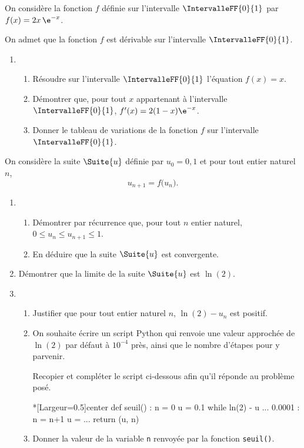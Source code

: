 On considère la fonction $f$ définie sur l'intervalle $\IntervalleFF{0}{1}$ par $f(x)=2x\,\e^{-x}$.

On admet que la fonction $f$ est dérivable sur l'intervalle $\IntervalleFF{0}{1}$.

\begin{enumerate}
	\item 
	\begin{enumerate}
		\item Résoudre sur l'intervalle $\IntervalleFF{0}{1}$ l'équation $f(x)=x$.
		\item Démontrer que, pour tout $x$ appartenant à l'intervalle $\IntervalleFF{0}{1}$, $f'(x)=2(1-x)\e^{-x}$.
		\item Donner le tableau de variations de la fonction $f$ sur l'intervalle $\IntervalleFF{0}{1}$.
	\end{enumerate}
\end{enumerate}


On considère la suite $\Suite{u}$ définie par $u_0=0,1$ et pour tout entier naturel $n$, \[ u_{n+1}=f\big(u_n\big).\]

\begin{enumerate}[resume]
	\item 
	\begin{enumerate}
		\item Démontrer par récurrence que, pour tout $n$ entier naturel, $0 \leqslant u_n \leqslant u_{n+1} \leqslant 1$.
		\item En déduire que la suite $\Suite{u}$ est convergente.
	\end{enumerate}
	\item Démontrer que la limite de la suite $\Suite{u}$ est $\ln(2)$.
	\item 
	\begin{enumerate}
		\item Justifier que pour tout entier naturel $n$, $\ln(2)-u_n$ est positif.
		\item On souhaite écrire un script \textsf{Python} qui renvoie une valeur approchée de $\ln(2)$ par défaut à $10^{-4}$ près, ainsi que le nombre d'étapes pour y parvenir.
		
		Recopier et compléter le script ci-dessous afin qu'il réponde au problème posé.

\begin{CodePythonLstAlt}*[Largeur=0.5\linewidth]{center}
def seuil() :
	n = 0
	u = 0.1
	while ln(2) - u ... 0.0001 :
		n = n+1
		u = ...
	return (u, n)
\end{CodePythonLstAlt}
	\item Donner la valeur de la variable \texttt{n} renvoyée par la fonction \texttt{seuil()}.
	\end{enumerate}
\end{enumerate}